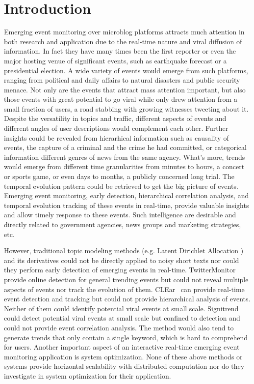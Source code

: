 \section{Introduction}

Emerging event monitoring over microblog platforms attracts much attention in both research and application due to the real-time nature and viral diffusion of information.
In fact they have many times been the first reporter or even the major hosting venue of significant events, such as earthquake forecast or a presidential election.
A wide variety of events would emerge from such platforms, ranging from political and daily affairs to natural disasters and public security menace.
Not only are the events that attract mass attention important, but also those events with great potential to go viral while only drew attention from a small fraction of users, \eg a road stabbing with growing witnesses tweeting about it.
Despite the versatility in topics and traffic, different aspects of events and different angles of user descriptions would complement each other.
Further insights could be revealed from hierarhical information such as causality of events, \eg the capture of a criminal and the crime he had committed, or categorical information \eg different genres of news from the same agency.
What's more, trends would emerge from different time granularities from minutes to hours, \eg a concert or sports game, or even days to months, \eg a publicly concerned long trial.
The temporal evolution pattern could be retrieved to get the big picture of events.
Emerging event monitoring, \ie early detection, hierarchical correlation analysis, and temporal evolution tracking of these events in real-time, provide valuable insights and allow timely response to these events.
Such intelligence are desirable and directly related to government agencies, news groups and marketing strategies, etc.

However, traditional topic modeling methods (e.g. Latent Dirichlet Allocation%
) and its derivatives could not be directly applied to noisy short texts nor could they perform early detection of emerging events in real-time.
TwitterMonitor~\cite{ mathioudakis2010twittermonitor} provide online detection for general trending events but could not reveal multiple aspects of events nor track the evolution of them.
CLEar~\cite{xie2014clear} can provide real-time event detection and tracking but could not provide hierarchical analysis of events.
Neither of them could identify potential viral events at small scale.
Signitrend~\cite{schubert2014signitrend} could detect potential viral events at small scale but confined to detection and could not provide event correlation analysis.
The method would also tend to generate trends that only contain a single keyword, which is hard to comprehend for users.
Another important aspect of an interactive real-time emerging event monitoring application is system optimization. 
None of these above methods or systems provide horizontal scalability with distributed computation nor do they investigate in system optimization for their application.


